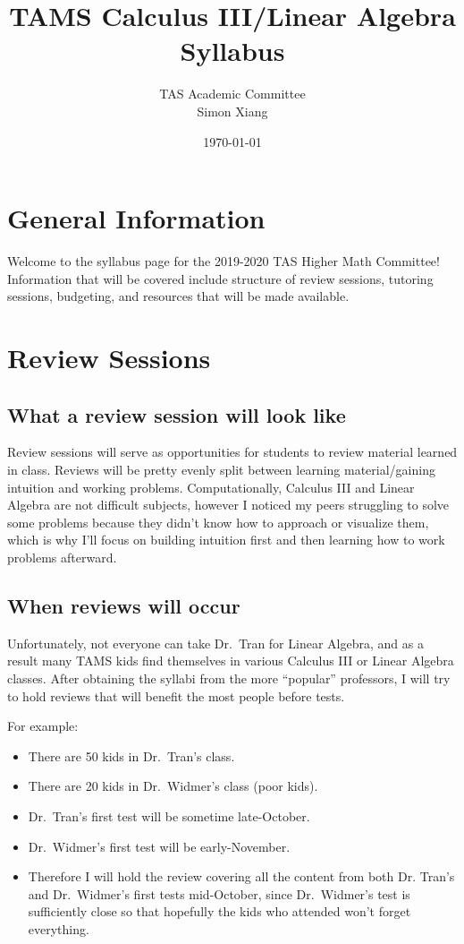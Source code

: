 \documentclass{article}
\title{TAMS Calculus III/Linear Algebra Syllabus}
\author{TAS Academic Committee\\Simon Xiang}
\date{\today}
\begin{document}
 
\maketitle

\section*{General Information}

Welcome to the syllabus page for the 2019-2020 TAS Higher Math Committee!
Information that will be covered include structure of review sessions, tutoring sessions, budgeting,
and resources that will be made available. 

\section*{Review Sessions}

\subsection*{What a review session will look like}

Review sessions will serve as opportunities for students to review material learned in class.
Reviews will be pretty evenly split between learning material\slash gaining intuition and 
working problems. Computationally, Calculus III and Linear Algebra are not difficult subjects, 
however I noticed my peers struggling to solve some problems because they didn't know how to 
approach or visualize them, which is why I'll focus on building intuition first and then learning
how to work problems afterward.

\subsection*{When reviews will occur}

Unfortunately, not everyone can take Dr.~Tran for Linear Algebra, and as a result many TAMS
kids find themselves in various Calculus III or Linear Algebra classes. After obtaining the syllabi from the
more ``popular'' professors, I will try to hold reviews that will benefit the most people before 
tests. 

For example:

\begin{itemize}
    \item There are 50 kids in Dr.~Tran's class.
    \item There are 20 kids in Dr.~Widmer's class (poor kids).
    \item Dr.~Tran's first test will be sometime late-October.
    \item Dr.~Widmer's first test will be early-November.
    \item Therefore I will hold the review covering all the content from both Dr. Tran's and Dr.~Widmer's %
    first tests mid-October, since Dr.~Widmer's test is sufficiently close so that hopefully the kids who %
    attended won't forget everything.
\end{itemize}
\end{document}
